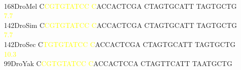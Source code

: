 \documentclass[11pt,twoside,reqno,a4paper]{article}
\begin{document}
{\\
168\hspace*{1\charwidth}DroMel	C\textcolor{Yellow}{C}\textcolor{Yellow}{G}\textcolor{Yellow}{T}\textcolor{Yellow}{G}\textcolor{Yellow}{T}\textcolor{Yellow}{A}\textcolor{Yellow}{T}\textcolor{Yellow}{C}\textcolor{Yellow}{C}	\textcolor{Yellow}{C}ACCACTCGA	CTAGTGCATT	TAGTGCTG\\
\hspace*{4\charwidth}\hspace*{7\charwidth}\hspace*{1\charwidth}\textcolor{Yellow}{7.7}\hspace*{1\charwidth}\hspace*{1\charwidth}\hspace*{1\charwidth}\\
142\hspace*{1\charwidth}DroSim	C\textcolor{Yellow}{C}\textcolor{Yellow}{G}\textcolor{Yellow}{T}\textcolor{Yellow}{G}\textcolor{Yellow}{T}\textcolor{Yellow}{A}\textcolor{Yellow}{T}\textcolor{Yellow}{C}\textcolor{Yellow}{C}	\textcolor{Yellow}{C}ACCACTCGA	CTAGTGCATT	TAGTGCTG\\
\hspace*{4\charwidth}\hspace*{7\charwidth}\hspace*{1\charwidth}\textcolor{Yellow}{7.7}\hspace*{1\charwidth}\hspace*{1\charwidth}\hspace*{1\charwidth}\\
142\hspace*{1\charwidth}DroSec	C\textcolor{Yellow}{T}\textcolor{Yellow}{G}\textcolor{Yellow}{T}\textcolor{Yellow}{G}\textcolor{Yellow}{T}\textcolor{Yellow}{A}\textcolor{Yellow}{T}\textcolor{Yellow}{C}\textcolor{Yellow}{C}	\textcolor{Yellow}{C}ACCACTCGA	CTAGTGCATT	TAGTGCTG\\
\hspace*{4\charwidth}\hspace*{7\charwidth}\hspace*{1\charwidth}\textcolor{Yellow}{10.3}\hspace*{1\charwidth}\hspace*{1\charwidth}\hspace*{1\charwidth}\\
99\hspace*{2\charwidth}DroYak	C\textcolor{Yellow}{C}\textcolor{Yellow}{G}\textcolor{Yellow}{T}\textcolor{Yellow}{G}\textcolor{Yellow}{T}\textcolor{Yellow}{A}\textcolor{Yellow}{T}\textcolor{Yellow}{C}\textcolor{Yellow}{C}	\textcolor{Yellow}{C}ACCACTCCA	CTAGTTCATT	TAATGCTG\\
}
\end{document}
